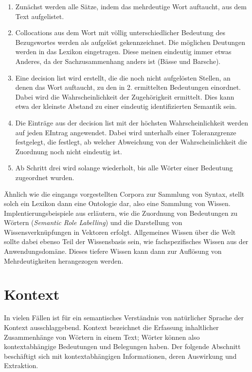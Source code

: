 \documentclass[12pt]{report}
\begin{document}
\begin{enumerate}
\item Zunächst werden alle Sätze, indem das mehrdeutige Wort auftaucht, aus dem Text aufgelistet.
\item Collocations aus dem Wort mit völlig unterschiedlicher Bedeutung des Bezugswortes werden als aufgelöst gekennzeichnet. Die möglichen Deutungen werden in das Lexikon eingetragen. Diese meinen eindeutig immer etwas Anderes, da der Sachzusammenhang anders ist (Bässe und Barsche).
\item Eine decision list wird erstellt, die die noch nicht aufgelösten Stellen, an denen das Wort auftaucht, zu den in 2. ermittelten Bedeutungen einordnet. Dabei wird die Wahrscheinlichkeit der Zugehörigkeit ermittelt. Dies kann etwa der kleinste Abstand zu einer eindeutig identifizierten Semantik sein.
\item Die Einträge aus der decision list mit der höchsten Wahrscheinlichkeit werden auf jeden EIntrag angewendet. Dabei wird unterhalb einer Toleranzgrenze festgelegt, die festlegt, ab welcher Abweichung von der Wahrscheinlichkeit die Zuordnung noch nicht eindeutig ist. 
\item Ab Schritt drei wird solange wiederholt, bis alle Wörter einer Bedeutung zugeordnet wurden.
\end{enumerate} 

Ähnlich wie die eingangs vorgestellten Corpora zur Sammlung von Syntax, stellt solch ein Lexikon dann eine Ontologie dar, also eine Sammlung von Wissen. Implentierungsbeispiele aus \cite{col11} erläutern, wie die Zuordnung von Bedeutungen zu Wörtern (\textit{Semantic Role Labelling}) und die Darstellung von Wissensverknüpfungen in Vektoren erfolgt. Allgemeines Wissen über die Welt sollte dabei ebenso Teil der Wissensbasis sein, wie fachspezifisches Wissen aus der Anwendungsdomäne. Dieses tiefere Wissen kann dann zur Auflösung von Mehrdeutigkeiten herangezogen werden.

\section{Kontext}
In vielen Fällen ist für ein semantisches Verständnis von natürlicher Sprache der Kontext ausschlaggebend. Kontext bezeichnet die Erfassung inhaltlicher Zusammenhänge von Wörtern in einem Text; Wörter können also kontextabhängige Bedeutungen und Belegungen haben. Der folgende Abschnitt beschäftigt sich mit kontextabhängigen Informationen, deren Auswirkung und Extraktion. 
\end{document}

